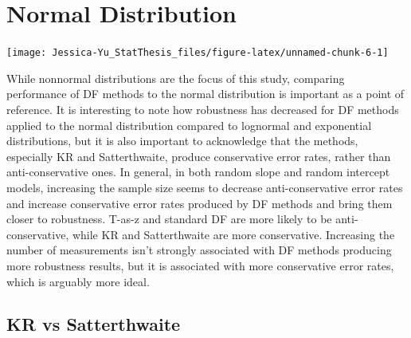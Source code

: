 \documentclass[12pt, twoside]{amherstthesis}
\begin{document}
\hypertarget{normal-distribution}{%
\section{Normal Distribution}\label{normal-distribution}}
\begin{center}\texttt{[image: Jessica-Yu\_StatThesis\_files/figure-latex/unnamed-chunk-6-1]} \end{center}

While nonnormal distributions are the focus of this study, comparing performance of DF methods to the normal distribution is important as a point of reference. It is interesting to note how robustness has decreased for DF methods applied to the normal distribution compared to lognormal and exponential distributions, but it is also important to acknowledge that the methods, especially KR and Satterthwaite, produce conservative error rates, rather than anti-conservative ones. In general, in both random slope and random intercept models, increasing the sample size seems to decrease anti-conservative error rates and increase conservative error rates produced by DF methods and bring them closer to robustness. T-as-z and standard DF are more likely to be anti-conservative, while KR and Satterthwaite are more conservative. Increasing the number of measurements isn't strongly associated with DF methods producing more robustness results, but it is associated with more conservative error rates, which is arguably more ideal.

\hypertarget{kr-vs-satterthwaite}{%
\subsection{KR vs Satterthwaite}\label{kr-vs-satterthwaite}}
\end{document}
